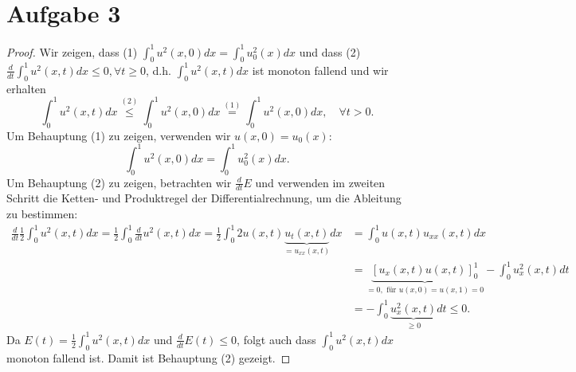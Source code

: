 \documentclass[a4paper,fontsize=8pt,DIV=1]{article}
\theoremstyle{plain}
\begin{document}
\section*{Aufgabe 3}
\begin{proof}
Wir zeigen, dass (1) $\int^1_0u^2(x,0)dx = \int^1_0u_0^2(x)dx$ und dass (2) $\frac{d}{dt}\int^1_0u^2(x,t)dx \leq 0, \forall t \geq 0$, d.h. $\int^1_0u^2(x,t)dx$ ist monoton fallend und wir erhalten
\[
	\int^1_0u^2(x,t)dx \overset{(2)}{\leq} \int^1_0u^2(x,0)dx \overset{(1)}{=} \int^1_0u^2(x,0)dx, \quad \forall t > 0.
\]
Um Behauptung (1) zu zeigen, verwenden wir $u(x,0) = u_0(x)$:
\[
	\int^1_0u^2(x,0)dx = \int^1_0u_0^2(x)dx.
\]
Um Behauptung (2) zu zeigen, betrachten wir $\frac{d}{dt}E$ und verwenden im zweiten Schritt die Ketten- und Produktregel der Differentialrechnung, um die Ableitung zu bestimmen:
\begin{align*}
	\frac{d}{dt} \frac{1}{2} \int^1_0 u^2(x,t) dx 
	= \frac{1}{2} \int^1_0 \frac{d}{dt}u^2(x,t)dx 
	= \frac{1}{2} \int^1_0 2u(x,t)\underbrace{u_t(x,t)}_{=u_{xx}(x,t)}dx
	&= \int^1_0 u(x,t)u_{xx}(x,t) dx \\
	&= \underbrace{[u_x(x,t) u(x,t)]^1_0}_{=0, \text{ für }u(x,0)=u(x,1)=0} - \int^1_0 u^2_x(x,t)dt \\
	&= - \int^1_0 \underbrace{u^2_x(x,t)}_{\geq 0}dt \leq 0.
\end{align*}
Da $E(t) = \frac{1}{2}\int^1_0u^2(x,t)dx$ und $\frac{d}{dt}E(t) \leq 0$, folgt auch dass $\int^1_0u^2(x,t)dx$ monoton fallend ist. Damit ist Behauptung (2) gezeigt.
\end{proof}
\end{document}
